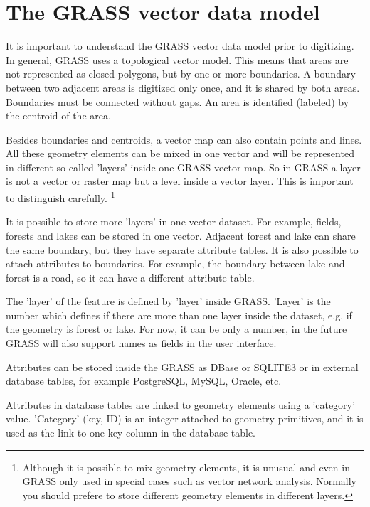 \section{The GRASS vector data model}\label{label_vectmodel}

It is important to understand the GRASS vector data model prior to
digitizing. In general, GRASS uses a topological
vector model. This means that areas are not represented
as closed polygons, but by one or more boundaries. A boundary between two
adjacent areas is digitized only once, and it is shared by both areas.
Boundaries must be connected without gaps. An area is identified (labeled) 
by the centroid of the area.

Besides boundaries and centroids, a vector map can also contain
points and lines. All these geometry elements can be mixed
in one vector and will be represented in different so called 'layers' inside
one GRASS vector map. So in GRASS a layer is not a vector or raster map but a
level inside a vector layer. This is important to distinguish carefully.
\footnote{Although it
is possible to mix geometry elements, it is unusual and even in GRASS only
used in special cases such as vector network analysis. Normally you should
prefere to store different geometry elements in different layers.}

It is possible to store more 'layers' in one vector dataset. For example,
fields, forests and lakes can be stored in one vector. Adjacent
forest and lake can share the same boundary, but they have separate attribute
tables. It is also possible to attach attributes to boundaries. For example,
the boundary between lake and forest is a road, so it can have a different 
attribute table.
 
The 'layer' of the feature is defined by 'layer' inside GRASS. 'Layer' is the 
number which defines if there are more than one layer inside the dataset, e.g. 
if the geometry is forest or lake. For now, it can be only a number, in the 
future GRASS will also support names as fields in the user interface.

Attributes can be stored inside the GRASS  as DBase or 
SQLITE3 or in external database tables, for example PostgreSQL, MySQL, 
Oracle, etc.

Attributes in database tables are linked to geometry elements using
a 'category' value. 'Category' (key, ID) is an
integer attached to geometry primitives, and it is used as the link to one
key column in the database table.

